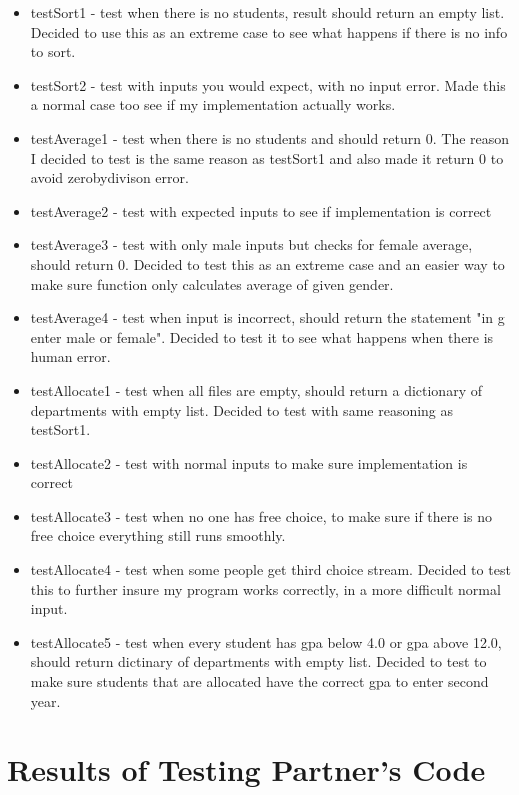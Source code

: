 \documentclass[12pt]{article}
\begin{document}
\begin{itemize}
  \item testSort1 - test when there is no students, result should return an empty list. Decided to use this as an extreme case to see what happens if there is no info to sort.
  \item testSort2 - test with inputs you would expect, with no input error. Made this a normal case too see if my implementation actually works.
  \item testAverage1 - test when there is no students and should return 0. The reason I decided to test is the same reason as testSort1 and also made it return 0 to avoid zerobydivison error.
  \item testAverage2 - test with expected inputs to see if implementation is correct
  \item testAverage3 - test with only male inputs but checks for female average, should return 0. Decided to test this as an extreme case and an easier way to make sure function only calculates average of given gender.
  \item testAverage4 - test when input is incorrect, should return the statement "in g enter male or female". Decided to test it to see what happens when there is human error.
  \item testAllocate1 - test when all files are empty, should return a dictionary of departments with empty list. Decided to test with same reasoning as testSort1.
  \item testAllocate2 - test with normal inputs to make sure implementation is correct
  \item testAllocate3 - test when no one has free choice, to make sure if there is no free choice everything still runs smoothly.
  \item testAllocate4 - test when some people get third choice stream. Decided to test this to further insure my program works correctly, in a more difficult normal input.
  \item testAllocate5 - test when every student has gpa below 4.0 or gpa above 12.0, should return dictinary of departments with empty list. Decided to test to make sure students that are allocated have the correct gpa to enter second year.
\end{itemize}



\section{Results of Testing Partner's Code}
\end{document}
